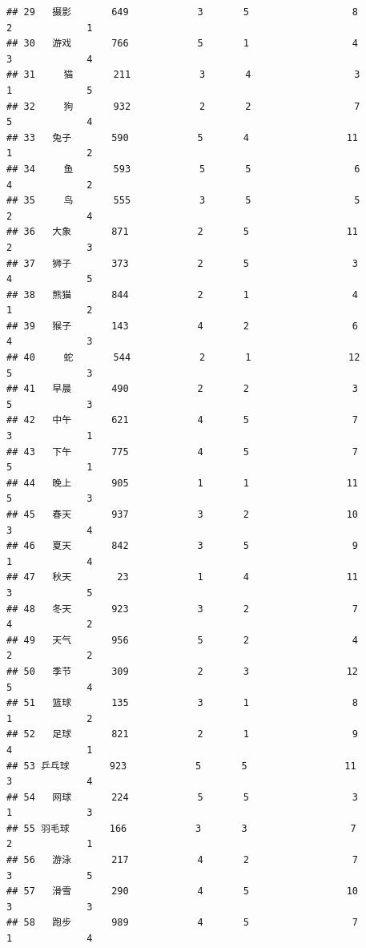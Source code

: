 \documentclass[]{book}
\begin{document}
\begin{verbatim}
## 29   摄影       649            3       5                  8          2             1
## 30   游戏       766            5       1                  4          3             4
## 31     猫       211            3       4                  3          1             5
## 32     狗       932            2       2                  7          5             4
## 33   兔子       590            5       4                 11          1             2
## 34     鱼       593            5       5                  6          4             2
## 35     鸟       555            3       5                  5          2             4
## 36   大象       871            2       5                 11          2             3
## 37   狮子       373            2       5                  3          4             5
## 38   熊猫       844            2       1                  4          1             2
## 39   猴子       143            4       2                  6          4             3
## 40     蛇       544            2       1                 12          5             3
## 41   早晨       490            2       2                  3          5             3
## 42   中午       621            4       5                  7          3             1
## 43   下午       775            4       5                  7          5             1
## 44   晚上       905            1       1                 11          5             3
## 45   春天       937            3       2                 10          3             4
## 46   夏天       842            3       5                  9          1             4
## 47   秋天        23            1       4                 11          3             5
## 48   冬天       923            3       2                  7          4             2
## 49   天气       956            5       2                  4          2             2
## 50   季节       309            2       3                 12          5             4
## 51   篮球       135            3       1                  8          1             2
## 52   足球       821            2       1                  9          4             1
## 53 乒乓球       923            5       5                 11          3             4
## 54   网球       224            5       5                  3          1             3
## 55 羽毛球       166            3       3                  7          2             1
## 56   游泳       217            4       2                  7          3             5
## 57   滑雪       290            4       5                 10          3             3
## 58   跑步       989            4       5                  7          1             4

\end{verbatim}
\end{document}
